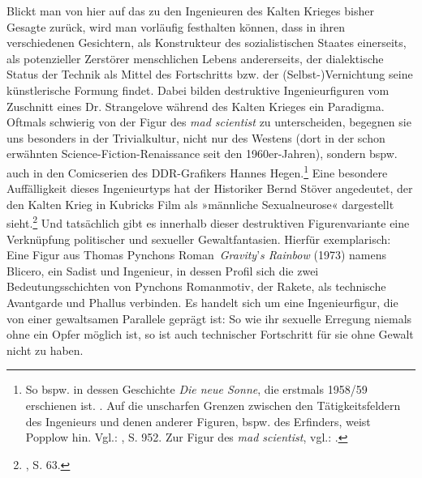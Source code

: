 \documentclass[%
	fontsize=10pt,%
	twoside,%
	headings=optiontoheadandtoc,%
	showtrims]{scrbook}
\begin{document}
\par Blickt man von hier auf das zu den Ingenieuren des Kalten Krieges bisher Gesagte zurück, wird man vorläufig festhalten können, dass in ihren verschiedenen Gesichtern, als Konstrukteur des sozialistischen Staates einerseits, als potenzieller Zerstörer menschlichen Lebens andererseits, der dialektische Status der Technik als Mittel des Fortschritts bzw. der (Selbst-)Vernichtung seine künstlerische Formung findet. Dabei bilden destruktive Ingenieurfiguren vom Zuschnitt eines Dr. Strangelove während des Kalten Krieges ein Paradigma. Oftmals schwierig von der Figur des \emph{mad scientist} zu unterscheiden, begegnen sie uns besonders in der Trivialkultur, nicht nur des Westens (dort in der schon erwähnten Science-Fiction-Renaissance seit den 1960er-Jahren), sondern bspw. auch in den Comicserien des DDR-Grafikers Hannes Hegen.\footnote{So bspw. in dessen Geschichte \emph{Die neue Sonne}, die erstmals 1958/59 erschienen ist. \cite[][]{hegen2011a}. Auf die unscharfen Grenzen zwischen den Tätigkeitsfeldern des Ingenieurs und denen anderer Figuren, bspw. des Erfinders, weist Popplow hin. Vgl.: \cite[][]{popplow2007a}, S. 952. Zur Figur des \emph{mad scientist}, vgl.: \cite[][]{sarasin2003a}.}  Eine besondere Auffälligkeit dieses Ingenieurtyps hat der Historiker Bernd Stöver angedeutet, der den Kalten Krieg in Kubricks Film als »männliche Sexualneurose« dargestellt sieht.\footnote{\cite[][]{stoever2008a}, S. 63.}  Und tatsächlich gibt es innerhalb dieser destruktiven Figurenvariante eine Verknüpfung politischer und sexueller Gewaltfantasien. Hierfür exemplarisch: Eine Figur aus Thomas Pynchons Roman~\emph{Gravity}\textquoteright{}\emph{s Rainbow} (1973) namens Blicero, ein Sadist und Ingenieur, in dessen Profil sich die zwei Bedeutungsschichten von Pynchons Romanmotiv, der Rakete, als technische Avantgarde und Phallus verbinden. Es handelt sich um eine Ingenieurfigur, die von einer gewaltsamen Parallele geprägt ist: So wie ihr sexuelle Erregung niemals ohne ein Opfer möglich ist, so ist auch technischer Fortschritt für sie ohne Gewalt nicht zu haben.
\end{document}
